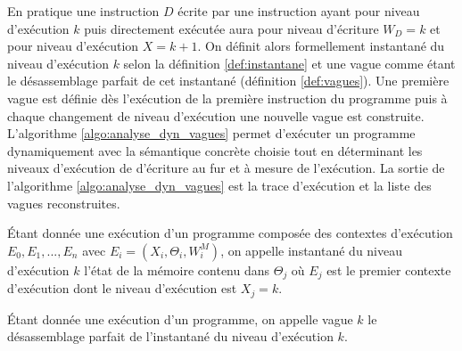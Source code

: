 
En pratique une instruction $D$ écrite par une instruction ayant pour niveau d'exécution $k$ puis directement exécutée aura pour niveau d'écriture $W_D=k$ et pour niveau d'exécution $X=k+1$. On définit alors formellement instantané du niveau d'exécution $k$ selon la définition \ref{def:instantane} et une vague comme étant le désassemblage parfait de cet instantané (définition \ref{def:vagues}).
Une première vague est définie dès l'exécution de la première instruction du programme puis à chaque changement de niveau d'exécution une nouvelle vague est construite.
L'algorithme \ref{algo:analyse_dyn_vagues} permet d'exécuter un programme dynamiquement avec la sémantique concrète choisie tout en déterminant les niveaux d'exécution de d'écriture au fur et à mesure de l'exécution. La sortie de l'algorithme \ref{algo:analyse_dyn_vagues} est la trace d'exécution et la liste des vagues reconstruites.
\\

\begin{defi}
 Étant donnée une exécution d'un programme composée des contextes d'exécution $E_0, E_1, ..., E_n$ avec $E_i=(X_i, \Theta_i, W_i^M)$, on appelle instantané du niveau d'exécution $k$ l'état de la mémoire contenu dans $\Theta_j$ où $E_j$ est le premier contexte d'exécution dont le niveau d'exécution est $X_j=k$.
 \label{def:instantane}
\end{defi}

\begin{defi}
 Étant donnée une exécution d'un programme, on appelle vague $k$ le désassemblage parfait de l'instantané du niveau d'exécution $k$.
 \label{def:vagues}
\end{defi}

